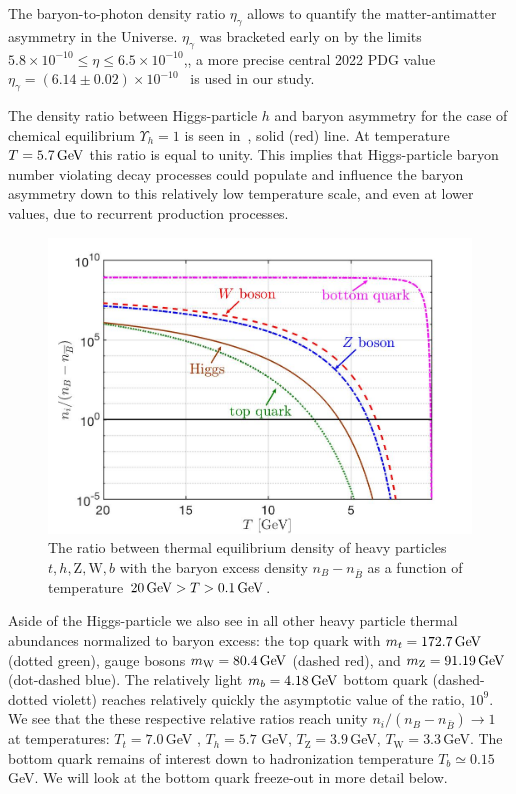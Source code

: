 {\color{blue}The baryon-to-photon density ratio $\eta_\gamma$ allows to quantify the matter-antimatter asymmetry in the Universe. $\eta_\gamma$ was bracketed early on  by the limits $5.8\times10^{-10} \leqslant\eta\leqslant6.5\times10^{-10}$,, a more precise central 2022 PDG value $\eta_\gamma=(6.14\pm0.02)\times10^{-10}$~\cite{ParticleDataGroup:2022pth} is used in our study.} 

{\color{blue}The density ratio between Higgs-particle $h$ and baryon asymmetry for the case of chemical equilibrium $\Upsilon_h=1$ is seen in~, solid (red) line. At temperature $T=5.7\text{\,GeV}$ this ratio is equal to unity. This implies that Higgs-particle baryon number violating decay processes could populate and influence the baryon asymmetry down to this relatively low temperature scale, and even at lower values, due to recurrent production processes.} 

\begin{figure}
\centerline{\includegraphics[width=0.96\linewidth]{./plots/ni_over_nb_vs_T-new.jpg}}
\caption{{\color{blue} The ratio between thermal equilibrium density of heavy particles $t,h, \mathrm{Z,W}, b$ with the baryon excess density $n_B-n_{\bar B}$ as a function of temperature $20\text{\,GeV}>T>0.1\text{\,GeV}$. 
}}
\label{HiggsDensity:fig} 
\end{figure}

{\color{blue}Aside of the Higgs-particle we also see in  all other heavy particle thermal abundances normalized to baryon excess: the top quark with $m_t=172.7\text{\,GeV}$ (dotted green), gauge bosons $m_\mathrm{W}=80.4\text{\,GeV}$ (dashed red), and $m_\mathrm{Z}=91.19\text{\,GeV}$ (dot-dashed blue). The relatively light $m_b=4.18\text{\,GeV}$ bottom quark (dashed-dotted violett) reaches relatively quickly the asymptotic value of the ratio, $10^{9}$. We see that the these respective relative ratios reach unity $n_i/(n_B-n_{\bar{B}})\to 1$ at temperatures: $T_t=7.0$\,GeV , $T_h=5.7$ GeV, $T_\mathrm{Z}=3.9$\,GeV, $T_\mathrm{W}=3.3$\,GeV. The bottom quark remains of interest down to hadronization temperature $T_b\simeq 0.15$\,GeV. We will look at the bottom quark freeze-out in more detail below.}


